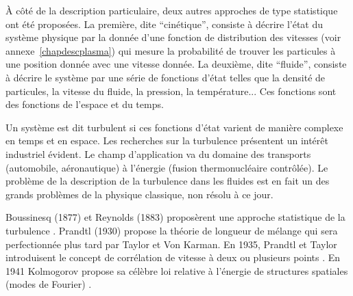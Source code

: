 \documentclass{book}
\begin{document}
\`A c\^ot\'e de la description particulaire, deux autres approches de
type 
statistique ont \'et\'e propos\'ees. La premi\`ere, dite
``cin\'etique'', consiste \`a d\'ecrire l'\'etat du syst\`eme physique
par la 
donn\'ee d'une fonction de distribution des vitesses (voir annexe~\ref{chapdescplasma})  qui mesure la probabilit\'e de trouver les
particules \`a une position donn\'ee avec une vitesse donn\'ee.
La deuxi\`eme, dite ``fluide'',
consiste \`a d\'ecrire le 
syst\`eme 
par une s\'erie de fonctions d'\'etat telles que la densit\'e de
particules, 
la vitesse du fluide, la pression, la temp\'erature...
Ces fonctions sont des fonctions de l'espace et du temps.

Un syst\`eme est dit turbulent si ces fonctions d'\'etat varient de
mani\`ere complexe en temps et en espace.
Les recherches sur la turbulence pr\'esentent un int\'er\^et industriel
\'evident. Le champ d'application va du domaine des transports
(automobile, a\'eronautique) \`a l'\'energie (fusion thermonucl\'eaire
contr\^ol\'ee). Le probl\`eme de la  description de la turbulence dans les
fluides est  
en fait un des grands probl\`emes de la physique classique, non
r\'esolu \`a ce jour.

Boussinesq (1877) et Reynolds (1883) propos\`erent une approche
statistique de la turbulence \cite{Frisch95,Stanisic85}. Prandtl (1930) propose la
th\'eorie de longueur de m\'elange qui sera perfectionn\'ee plus tard
par Taylor et Von Karman. En 1935, Prandtl et Taylor
introduisent le concept de corr\'elation de vitesse \`a deux ou
plusieurs points \cite{Stanisic85}.
En 1941 Kolmogorov \cite{Kolmogorov41} propose sa c\'el\`ebre loi
relative \`a l'\'energie 
de structures spatiales (modes de Fourier) \cite{Lesieur90}.
\end{document}
